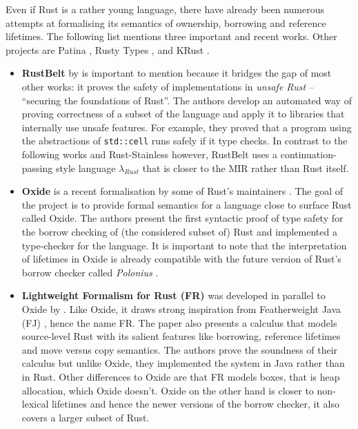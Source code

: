 Even if Rust is a rather young language, there have already been numerous
attempts at formalising its semantics of ownership, borrowing and reference
lifetimes. The following list mentions three important and recent works. Other
projects are Patina \cite{patina}, Rusty Types \cite{rusty-types}, and KRust
\cite{krust}.

\begin{itemize}
\item
  \textbf{RustBelt} by \citet{rustbelt} is important to mention because
  it bridges the gap of most other works: it proves the safety of
  implementations in \emph{unsafe Rust} -- ``securing the foundations of
  Rust''. The authors develop an automated way of proving correctness of
  a subset of the language and apply it to libraries that internally use
  unsafe features. For example, they proved that a program using the
  abstractions of \passthrough{\lstinline!std::cell!} runs safely if it
  type checks. In contrast to the following works and Rust-Stainless
  however, RustBelt uses a continuation-passing style language
  \(\lambda_{Rust}\) that is closer to the MIR rather than Rust itself.

\item
  \textbf{Oxide} is a recent formalisation by some of Rust's maintainers
  \citet{oxide}. The goal of the project is to provide formal semantics
  for a language close to surface Rust called Oxide. The authors present
  the first syntactic proof of type safety for the borrow checking of
  (the considered subset of) Rust and implemented a type-checker for the
  language. It is important to note that the interpretation of lifetimes
  in Oxide is already compatible with the future version of Rust's
  borrow checker called \emph{Polonius} \cite{polonius}.

\item
  \textbf{Lightweight Formalism for Rust (FR)} was developed in parallel
  to Oxide by \citet{fr}. Like Oxide, it draws strong inspiration from
  Featherweight Java (FJ) \cite{fj}, hence the name FR. The paper also
  presents a calculus that models source-level Rust with its salient
  features like borrowing, reference lifetimes and move versus copy
  semantics. The authors prove the soundness of their calculus but
  unlike Oxide, they implemented the system in Java rather than in Rust.
  Other differences to Oxide are that FR models boxes, that is heap
  allocation, which Oxide doesn't. Oxide on the other hand is closer to
  non-lexical lifetimes and hence the newer versions of the borrow
  checker, it also covers a larger subset of Rust.
\end{itemize}

